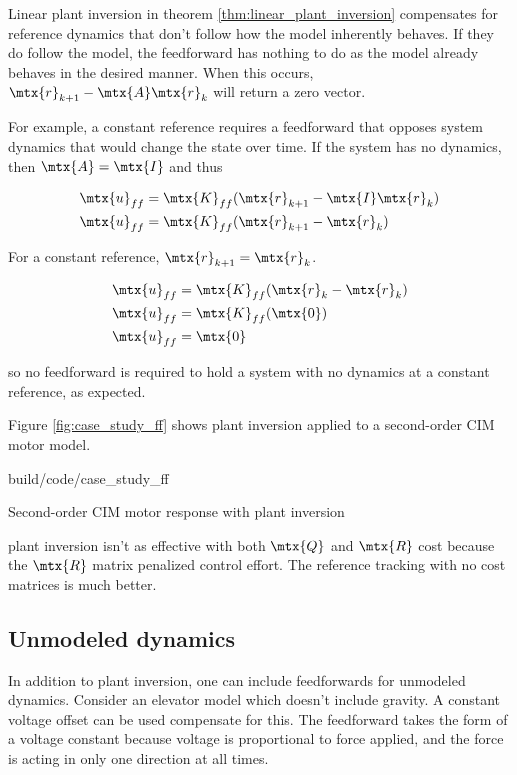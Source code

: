 Linear \gls{plant} inversion in theorem \ref{thm:linear_plant_inversion}
compensates for \gls{reference} dynamics that don't follow how the \gls{model}
inherently behaves. If they do follow the \gls{model}, the feedforward has
nothing to do as the \gls{model} already behaves in the desired manner. When
this occurs, $\mtx{r}_{k+1} - \mtx{A}\mtx{r}_k$ will return a zero vector.

For example, a constant \gls{reference} requires a feedforward that opposes
\gls{system} dynamics that would change the \gls{state} over time. If the
\gls{system} has no dynamics, then $\mtx{A} = \mtx{I}$ and thus

\begin{align*}
  \mtx{u}_{ff} &= \mtx{K}_{ff} (\mtx{r}_{k+1} - \mtx{I}\mtx{r}_k) \\
  \mtx{u}_{ff} &= \mtx{K}_{ff} (\mtx{r}_{k+1} - \mtx{r}_k)
\end{align*}

For a constant \gls{reference}, $\mtx{r}_{k+1} = \mtx{r}_k$.

\begin{align*}
  \mtx{u}_{ff} &= \mtx{K}_{ff} (\mtx{r}_k - \mtx{r}_k) \\
  \mtx{u}_{ff} &= \mtx{K}_{ff} (\mtx{0}) \\
  \mtx{u}_{ff} &= \mtx{0}
\end{align*}

so no feedforward is required to hold a \gls{system} with no dynamics at a
constant \gls{reference}, as expected.

Figure \ref{fig:case_study_ff} shows \gls{plant} inversion applied to a
second-order CIM motor model.

\begin{svg}{build/code/case_study_ff}
  \caption{Second-order CIM motor response with plant inversion}
  \label{fig:case_study_ff}
\end{svg}

\Gls{plant} inversion isn't as effective with both $\mtx{Q}$ and $\mtx{R}$ cost
because the $\mtx{R}$ matrix penalized \gls{control effort}. The \gls{reference}
\gls{tracking} with no cost matrices is much better.

\subsection{Unmodeled dynamics}

In addition to \gls{plant} inversion, one can include feedforwards for unmodeled
dynamics. Consider an elevator model which doesn't include gravity. A constant
voltage offset can be used compensate for this. The feedforward takes the form
of a voltage constant because voltage is proportional to force applied, and the
force is acting in only one direction at all times.

